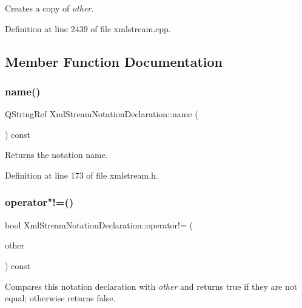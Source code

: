 Creates a copy of {\itshape other}. 

Definition at line 2439 of file xmlstream.\+cpp.



\subsection{Member Function Documentation}
\mbox{\label{class_xml_stream_notation_declaration_a4da496e98a28ca1a7900cb1b53e02ab7}} 
\subsubsection{\texorpdfstring{name()}{name()}}
{\footnotesize\ttfamily Q\+String\+Ref Xml\+Stream\+Notation\+Declaration\+::name (\begin{DoxyParamCaption}{ }\end{DoxyParamCaption}) const\hspace{0.3cm}{\ttfamily [inline]}}

Returns the notation name. 

Definition at line 173 of file xmlstream.\+h.

\mbox{\label{class_xml_stream_notation_declaration_a01ba1938f916a1bc849ad16e356aabfc}} 
\subsubsection{\texorpdfstring{operator"!=()}{operator!=()}}
{\footnotesize\ttfamily bool Xml\+Stream\+Notation\+Declaration\+::operator!= (\begin{DoxyParamCaption}\item[{const \hyperlink{class_xml_stream_notation_declaration}{Xml\+Stream\+Notation\+Declaration} \&}]{other }\end{DoxyParamCaption}) const\hspace{0.3cm}{\ttfamily [inline]}}

Compares this notation declaration with {\itshape other} and returns {\ttfamily true} if they are not equal; otherwise returns {\ttfamily false}. 

